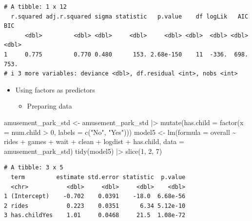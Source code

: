 \documentclass[
  ignorenonframetext,
]{beamer}
\newenvironment{Shaded}{\begin{snugshade}}{\end{snugshade}}
\newcommand{\AttributeTok}[1]{\textcolor[rgb]{0.40,0.45,0.13}{#1}}
\newcommand{\DecValTok}[1]{\textcolor[rgb]{0.68,0.00,0.00}{#1}}
\newcommand{\FunctionTok}[1]{\textcolor[rgb]{0.28,0.35,0.67}{#1}}
\newcommand{\NormalTok}[1]{\textcolor[rgb]{0.00,0.23,0.31}{#1}}
\newcommand{\OtherTok}[1]{\textcolor[rgb]{0.00,0.23,0.31}{#1}}
\newcommand{\SpecialCharTok}[1]{\textcolor[rgb]{0.37,0.37,0.37}{#1}}
\newcommand{\StringTok}[1]{\textcolor[rgb]{0.13,0.47,0.30}{#1}}
\providecommand{\tightlist}{%
  \setlength{\itemsep}{0pt}\setlength{\parskip}{0pt}}\usepackage{longtable,booktabs,array}
\begin{document}
\begin{frame}[fragile]{}
\begin{verbatim}
# A tibble: 1 x 12
  r.squared adj.r.squared sigma statistic   p.value    df logLik   AIC   BIC
      <dbl>         <dbl> <dbl>     <dbl>     <dbl> <dbl>  <dbl> <dbl> <dbl>
1     0.775         0.770 0.480      153. 2.68e-150    11  -336.  698.  753.
# i 3 more variables: deviance <dbl>, df.residual <int>, nobs <int>
\end{verbatim}
\end{frame}

\begin{frame}[fragile]{}
\label{section-38}
\begin{itemize}
\item
  Using factors as predictors

  \begin{itemize}
  \tightlist
  \item
    Preparing data
  \end{itemize}
\end{itemize}

\tiny

\begin{Shaded}
\begin{Highlighting}[]
\NormalTok{amusement\_park\_std }\OtherTok{\textless{}{-}}\NormalTok{ amusement\_park\_std }\SpecialCharTok{|\textgreater{}}
  \FunctionTok{mutate}\NormalTok{(}\AttributeTok{has.child =} \FunctionTok{factor}\NormalTok{(}\AttributeTok{x =}\NormalTok{ num.child }\SpecialCharTok{\textgreater{}} \DecValTok{0}\NormalTok{, }\AttributeTok{labels =} \FunctionTok{c}\NormalTok{(}\StringTok{"No"}\NormalTok{, }\StringTok{"Yes"}\NormalTok{)))}
\NormalTok{model5 }\OtherTok{\textless{}{-}} \FunctionTok{lm}\NormalTok{(}\AttributeTok{formula =}\NormalTok{ overall }\SpecialCharTok{\textasciitilde{}}\NormalTok{ rides }\SpecialCharTok{+}\NormalTok{ games }\SpecialCharTok{+}\NormalTok{ wait }\SpecialCharTok{+}\NormalTok{ clean }\SpecialCharTok{+}\NormalTok{ logdist }\SpecialCharTok{+}\NormalTok{ has.child,}
             \AttributeTok{data =}\NormalTok{ amusement\_park\_std)}
\FunctionTok{tidy}\NormalTok{(model5) }\SpecialCharTok{|\textgreater{}} \FunctionTok{slice}\NormalTok{(}\DecValTok{1}\NormalTok{, }\DecValTok{2}\NormalTok{, }\DecValTok{7}\NormalTok{)}
\end{Highlighting}
\end{Shaded}

\begin{verbatim}
# A tibble: 3 x 5
  term         estimate std.error statistic  p.value
  <chr>           <dbl>     <dbl>     <dbl>    <dbl>
1 (Intercept)    -0.702    0.0391    -18.0  6.68e-56
2 rides           0.223    0.0351      6.34 5.12e-10
3 has.childYes    1.01     0.0468     21.5  1.08e-72
\end{verbatim}


\end{frame}
\end{document}
